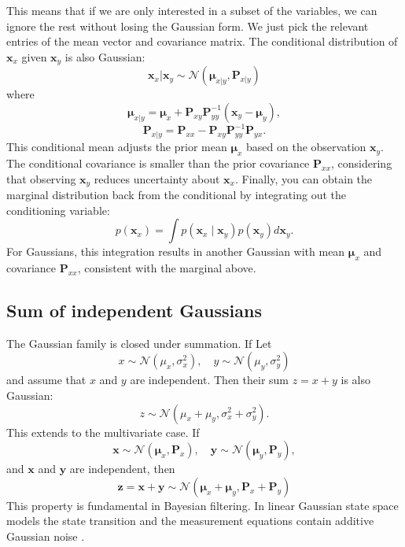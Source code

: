 This means that if we are only interested in a subset of the variables, we can ignore the rest without losing the Gaussian form. We just pick the relevant entries of the mean vector and covariance matrix. 
The conditional distribution of $\mathbf{x}_x$ given $\mathbf{x}_y$ is also Gaussian:
\[
\mathbf{x}_x | \mathbf{x}_y \sim
\mathcal{N}(\boldsymbol{\mu}_{x|y}, \mathbf{P}_{x|y})
\]
where
\[
\boldsymbol{\mu}_{x|y} = \boldsymbol{\mu}_x + \mathbf{P}_{xy}\mathbf{P}_{yy}^{-1}(\mathbf{x}_y - \boldsymbol{\mu}_y), 
\]
\[
\mathbf{P}_{x|y} = \mathbf{P}_{xx} - \mathbf{P}_{xy}\mathbf{P}_{yy}^{-1}\mathbf{P}_{yx}.
\]
This conditional mean adjusts the prior mean $\boldsymbol{\mu}_x$ based on the observation $\mathbf{x}_y$. The conditional covariance is smaller than the prior covariance $\mathbf{P}_{xx}$, considering that observing $\mathbf{x}_y$ reduces uncertainty about $\mathbf{x}_x$.
Finally, you can obtain the marginal distribution back from the conditional by integrating out the conditioning variable: 
\[
p(\mathbf{x}_x) = \int p(\mathbf{x}_x \mid \mathbf{x}_y) p(\mathbf{x}_y) d\mathbf{x}_y.
\]
For Gaussians, this integration results in another Gaussian with mean $\boldsymbol{\mu}_x$ and covariance $\mathbf{P}_{xx}$, consistent with the marginal above.

\subsection*{Sum of independent Gaussians}
The Gaussian family is closed under summation. If  
Let 
\[
x \sim \mathcal{N}(\mu_x,\sigma^2_x), \quad y \sim \mathcal{N}(\mu_y, \sigma^2_y)
\]
and assume that $x$ and $y$ are independent. Then their sum $z=x+y$ is also Gaussian: 
\[
z \sim \mathcal{N}(\mu_x+\mu_y, \sigma^2_x + \sigma^2_y).
\]
This extends to the multivariate case. If 
\[
\mathbf{x} \sim \mathcal{N}(\boldsymbol{\mu}_x, \mathbf{P}_x), \quad \mathbf{y} \sim\mathcal{N}(\boldsymbol{\mu}_y, \mathbf{P}_y),
\]
and $\mathbf{x}$ and $\mathbf{y}$ are independent, then 
\[
\mathbf{z} = \mathbf{x} + \mathbf{y} \sim \mathcal{N}(\boldsymbol{\mu}_x + \boldsymbol{\mu}_y, \mathbf{P}_x+ \mathbf{P}_y)
\]
This property is fundamental in Bayesian filtering. In linear Gaussian state space models the state transition and the measurement equations contain additive Gaussian noise . 

